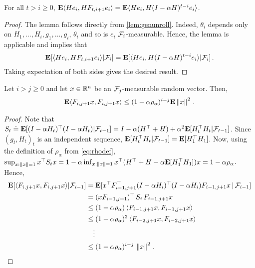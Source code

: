 \begin{lemma}\label{lem:unroll}
For all $t>i\ge 0$, $\mathbf{E} \langle He_i,H F_{t,i+1} e_i\rangle=\mathbf{E}\langle He_i,H(I-\alpha H)^{t-i} e_i\rangle$.
\end{lemma}
\begin{proof}
The lemma follows directly from \cref{lem:genunroll}. Indeed, 
$\theta_i$ depends only on $H_1,\dots,H_{i},g_1,\dots,g_{i}$, $\theta_i$ and so is $e_i$ $\mathcal{F}_i$-measurable.
Hence, the lemma is applicable and implies that
\begin{align*}
\mathbf{E}[ \langle He_i, HF_{t,i+1} e_i\rangle | \mathcal{F}_i ] = 
\mathbf{E}[ \langle He_i, H (I-\alpha H)^{t-i} e_i\rangle | \mathcal{F}_i ]\,.
\end{align*}
Taking expectation of both sides gives the desired result.
\end{proof}

\begin{lemma}\label{innerproduct}
Let $i>j \ge 0$ and let $x\in \mathbb{R}^n$ be an $\mathcal{F}_j$-measurable random vector.
Then, 
\begin{align*}
\mathbf{E}\langle F_{i,j+1}x,F_{i,j+1}x\rangle\leq (1-\alpha \rho_\alpha)^{i-j}\mathbf{E}\left\| x\right\|^2\,.
\end{align*}
\end{lemma}
\begin{proof}
Note that
$S_t\doteq \mathbf{E}[ (I-\alpha H_t)^\top (I-\alpha H_t) | \mathcal{F}_{t-1} ] 
= I - \alpha (H^\top + H) + \alpha^2 \mathbf{E}[ H_t^\top H_t | \mathcal{F}_{t-1} ]$.
Since $(g_t,H_t)_t$ is an independent sequence, $\mathbf{E}[ H_t^\top H_t|\mathcal{F}_{t-1}] = \mathbf{E}[ H_1^\top H_1 ]$.
Now, using the definition of $\rho_\alpha$ from \eqref{eq:rhodef},
$\sup_{x:\left\| x\right\|= 1} x^\top S_t x = 1 - \alpha \inf_{x:\left\| x\right\|=1} x^\top (H^\top + H - \alpha \mathbf{E}[H_1^\top H_1]) x 
= 1-\alpha \rho_\alpha$.
Hence,
\begin{align*}
\mathbf{E}[\langle F_{i,j+1}x,F_{i,j+1}x\rangle|\mathcal{F}_{i-1} ]
&= \mathbf{E}[x^\top F_{i-1,j+1}^\top (I-\alpha H_i)^\top (I-\alpha H_i) F_{i-1,j+1} x\,|\,\mathcal{F}_{i-1}]\\
&=(x F_{i-1,j+1})^\top \, S_i \, F_{i-1,j+1} x\\
&\le (1-\alpha \rho_\alpha) \, \langle F_{i-1,j+1} x, F_{i-1,j+1} x\rangle \\
& \le (1-\alpha \rho_\alpha)^2\, \langle F_{i-2,j+1} x, F_{i-2,j+1} x\rangle \\
& \quad \vdots \\
& \le (1-\alpha \rho_\alpha)^{i-j}\, \left\| x\right\|^2\,.
\end{align*}
\end{proof}






